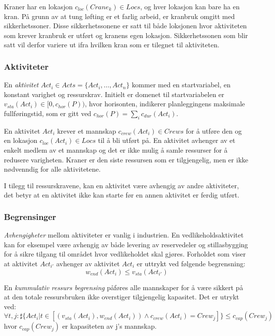 Kraner har en lokasjon $ c_{loc}(Crane_{k}) \in Locs $, og hver lokasjon kan bare ha en kran. På grunn av at tung løfting er et farlig arbeid, er kranbruk omgitt med sikkerhetssoner. Disse sikkerhetssonene er satt til både loksjonen hvor aktiviteten som krever kranbruk er utført og kranens egen lokasjon. Sikkerhetssonen som blir satt vil derfor variere ut ifra hvilken kran som er tilegnet til aktiviteten.

\subsubsection{Aktiviteter}
En \textit{aktivitet} $ Act_{i} \in Acts = \{ Act_{i},\dots,Act_{n} \} $ kommer med en startvariabel, en konstant varighet og ressurskrav. Initielt er domenet til startvariabelen er $ v_{sta}(Act_{i}) \in [ 0, c_{hor}(P)) $, hvor horisonten, indikerer planleggingens maksimale fullføringstid, som er gitt ved $ c_{hor}(P) = \sum_{i} c_{dur}(Act_{i}) $.

En aktivitet $ Act_{i} $ krever et mannskap $ c_{crew}(Act_{i}) \in Crews $ for å utføre den og en lokasjon $ c_{loc}(Act_{i}) \in Locs $ til å bli utført på. En aktivitet avhenger av et enkelt medlem av et mannskap og det er ikke mulig å samle ressurser for å redusere varigheten. Kraner er den siste ressursen som er tilgjengelig, men er ikke nødvenndig for alle aktivitetene.

I tilegg til ressurskravene, kan en aktivitet være avhengig av andre aktiviteter, det betyr at en aktivitet ikke kan starte før en annen aktivitet er ferdig utført.

\subsubsection{Begrensinger}
\textit{Avhengigheter} mellom aktiviteter er vanlig i industrien. En vedlikeholdsaktivitet kan for eksempel være avhengig av både levering av reservedeler og stillasbygging for å sikre tilgang til området hvor vedlikeholdet skal gjøres. Forholdet som viser at aktivitet $ Act_{i'} $ avhenger av aktivitet $ Act_{i} $ er uttrykt ved følgende begrensning: 
\begin{equation}
w_{end}(Act_{i}) \leq v_{sta}(Act_{i'})
\end{equation}

En \textit{kummulativ ressurs begrensing} påføres alle mannskaper for å være sikkert på at den totale ressursbruken ikke overstiger tilgjengelig kapasitet. Det er utrykt ved: 
\begin{equation}
\forall t,j : \sharp \{ Act_{i} | t \in [(v_{sta}(Act_{i}), w_{end}(Act_{i})) \wedge c_{crew}(Act_{i}) = Crew_{j}] \} \leq c_{cap}(Crew_{j})
\end{equation}
hvor $ c_{cap}(Crew_{j}) $ er kapasiteten av j's mannskap.

